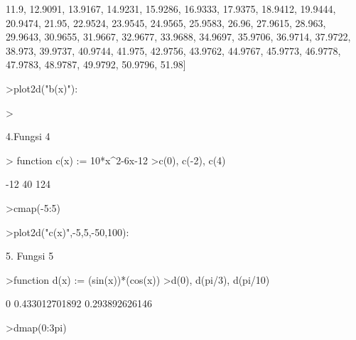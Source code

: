 \documentclass{article}
\begin{document}
\begin{eulernotebook}
\begin{eulercomment}
\begin{eulercomment}
\begin{euleroutput}
  11.9,  12.9091,  13.9167,  14.9231,  15.9286,  16.9333,  17.9375,
  18.9412,  19.9444,  20.9474,  21.95,  22.9524,  23.9545,  24.9565,
  25.9583,  26.96,  27.9615,  28.963,  29.9643,  30.9655,  31.9667,
  32.9677,  33.9688,  34.9697,  35.9706,  36.9714,  37.9722,  38.973,
  39.9737,  40.9744,  41.975,  42.9756,  43.9762,  44.9767,  45.9773,
  46.9778,  47.9783,  48.9787,  49.9792,  50.9796,  51.98]
\end{euleroutput}
\begin{eulerprompt}
>plot2d("b(x)"):
\end{eulerprompt}
\begin{eulerprompt}
>      
\end{eulerprompt}
\begin{eulercomment}
4.Fungsi 4
\end{eulercomment}
\begin{eulerprompt}
> function c(x) := 10*x^2-6x-12
>c(0), c(-2), c(4)
\end{eulerprompt}
\begin{euleroutput}
  -12
  40
  124
\end{euleroutput}
\begin{eulerprompt}
>cmap(-5:5)
\end{eulerprompt}
\begin{euleroutput}
  [268,  172,  96,  40,  4,  -12,  -8,  16,  60,  124,  208]
\end{euleroutput}
\begin{eulerprompt}
>plot2d("c(x)",-5,5,-50,100):
\end{eulerprompt}
\begin{eulercomment}
5. Fungsi 5
\end{eulercomment}
\begin{eulerprompt}
>function d(x) := (sin(x))*(cos(x))
>d(0), d(pi/3), d(pi/10)
\end{eulerprompt}
\begin{euleroutput}
  0
  0.433012701892
  0.293892626146
\end{euleroutput}
\begin{eulerprompt}
>dmap(0:3pi)
\end{eulerprompt}
\begin{euleroutput}
  [0,  0.454649,  -0.378401,  -0.139708,  0.494679,  -0.272011,
  -0.268286,  0.495304,  -0.143952,  -0.375494]
\end{euleroutput}
\begin{eulerprompt}

\end{eulerprompt}
\end{eulercomment}
\end{eulercomment}
\end{eulernotebook}
\end{document}
